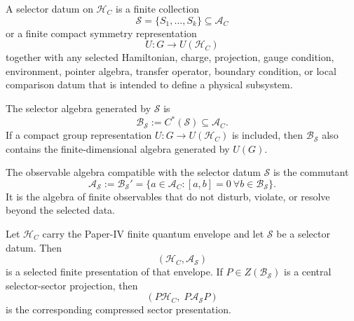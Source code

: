 \documentclass[12pt,a4paper]{article}
\begin{document}
\begin{definition}
\label{p12:def:selector-datum}
A selector datum on \(\mathcal H_C\) is a finite collection
\[
\mathcal S=\{S_1,\ldots,S_k\}\subseteq\mathcal A_C
\]
or a finite compact symmetry representation
\[
U:G\to U(\mathcal H_C)
\]
together with any selected Hamiltonian, charge, projection, gauge condition, environment, pointer algebra, transfer operator, boundary condition, or local comparison datum that is intended to define a physical subsystem.

The selector algebra generated by \(\mathcal S\) is
\begin{equation}
\label{p12:eq:selector-algebra}
\mathcal B_{\mathcal S}:=C^\ast(\mathcal S)\subseteq\mathcal A_C.
\end{equation}
If a compact group representation \(U:G\to U(\mathcal H_C)\) is included, then \(\mathcal B_{\mathcal S}\) also contains the finite-dimensional algebra generated by \(U(G)\).
\end{definition}

\begin{definition}
\label{p12:def:accessible-commutant-algebra}
The observable algebra compatible with the selector datum \(\mathcal S\) is the commutant
\begin{equation}
\label{p12:eq:accessible-commutant}
\mathcal A_{\mathcal S}
:=
\mathcal B_{\mathcal S}'
=
\{a\in\mathcal A_C:[a,b]=0\ \forall b\in\mathcal B_{\mathcal S}\}.
\end{equation}
It is the algebra of finite observables that do not disturb, violate, or resolve beyond the selected data.
\end{definition}

\begin{proposition}
\label{p12:thm:finite-selector-commutant-subsystem}
Let \(\mathcal H_C\) carry the Paper-IV finite quantum envelope and let
\(\mathcal S\) be a selector datum.  Then
\[
(\mathcal H_C,\mathcal A_{\mathcal S})
\]
is a selected finite presentation of that envelope.  If
\(P\in Z(\mathcal B_{\mathcal S})\) is a central selector-sector projection,
then
\begin{equation}
\label{p12:eq:compressed-selector-subsystem}
(P\mathcal H_C,\;P\mathcal A_{\mathcal S}P)
\end{equation}
is the corresponding compressed sector presentation.
\end{proposition}
\end{document}
